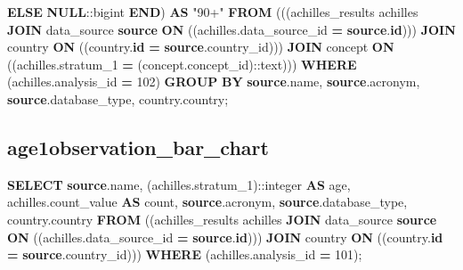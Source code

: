 \documentclass[
]{book}
\newenvironment{Shaded}{\begin{snugshade}}{\end{snugshade}}
\newcommand{\CharTok}[1]{\textcolor[rgb]{0.31,0.60,0.02}{#1}}
\newcommand{\ControlFlowTok}[1]{\textcolor[rgb]{0.13,0.29,0.53}{\textbf{#1}}}
\newcommand{\DecValTok}[1]{\textcolor[rgb]{0.00,0.00,0.81}{#1}}
\newcommand{\FunctionTok}[1]{\textcolor[rgb]{0.00,0.00,0.00}{#1}}
\newcommand{\KeywordTok}[1]{\textcolor[rgb]{0.13,0.29,0.53}{\textbf{#1}}}
\newcommand{\NormalTok}[1]{#1}
\newcommand{\OperatorTok}[1]{\textcolor[rgb]{0.81,0.36,0.00}{\textbf{#1}}}
\newcommand{\OtherTok}[1]{\textcolor[rgb]{0.56,0.35,0.01}{#1}}
\begin{document}
\begin{Shaded}
\begin{Highlighting}[]
           \ControlFlowTok{ELSE} \KeywordTok{NULL}\NormalTok{:}\CharTok{:bigint}
       \ControlFlowTok{END}\NormalTok{) }\KeywordTok{AS} \OtherTok{"90+"}
  \KeywordTok{FROM}\NormalTok{ (((achilles\_results achilles}
    \KeywordTok{JOIN}\NormalTok{ data\_source }\KeywordTok{source} \KeywordTok{ON}\NormalTok{ ((achilles.data\_source\_id }\OperatorTok{=} \KeywordTok{source}\NormalTok{.}\KeywordTok{id}\NormalTok{)))}
    \KeywordTok{JOIN}\NormalTok{ country }\KeywordTok{ON}\NormalTok{ ((country.}\KeywordTok{id} \OperatorTok{=} \KeywordTok{source}\NormalTok{.country\_id)))}
    \KeywordTok{JOIN}\NormalTok{ concept }\KeywordTok{ON}\NormalTok{ ((achilles.stratum\_1 }\OperatorTok{=}\NormalTok{ (concept.concept\_id):}\CharTok{:text}\NormalTok{)))}
 \KeywordTok{WHERE}\NormalTok{ (achilles.analysis\_id }\OperatorTok{=} \DecValTok{102}\NormalTok{)}
 \KeywordTok{GROUP} \KeywordTok{BY} \KeywordTok{source}\NormalTok{.name, }\KeywordTok{source}\NormalTok{.acronym, }\KeywordTok{source}\NormalTok{.database\_type, country.country;}
\end{Highlighting}
\end{Shaded}

\hypertarget{age1observation_bar_chart}{%
\subsection*{age1observation\_bar\_chart}\label{age1observation_bar_chart}}

\begin{Shaded}
\begin{Highlighting}[]
\KeywordTok{SELECT} \KeywordTok{source}\NormalTok{.name,}
\NormalTok{   (achilles.stratum\_1):}\CharTok{:integer} \KeywordTok{AS}\NormalTok{ age,}
\NormalTok{   achilles.count\_value }\KeywordTok{AS} \FunctionTok{count}\NormalTok{,}
   \KeywordTok{source}\NormalTok{.acronym,}
   \KeywordTok{source}\NormalTok{.database\_type,}
\NormalTok{   country.country}
  \KeywordTok{FROM}\NormalTok{ ((achilles\_results achilles}
    \KeywordTok{JOIN}\NormalTok{ data\_source }\KeywordTok{source} \KeywordTok{ON}\NormalTok{ ((achilles.data\_source\_id }\OperatorTok{=} \KeywordTok{source}\NormalTok{.}\KeywordTok{id}\NormalTok{)))}
    \KeywordTok{JOIN}\NormalTok{ country }\KeywordTok{ON}\NormalTok{ ((country.}\KeywordTok{id} \OperatorTok{=} \KeywordTok{source}\NormalTok{.country\_id)))}
 \KeywordTok{WHERE}\NormalTok{ (achilles.analysis\_id }\OperatorTok{=} \DecValTok{101}\NormalTok{);}
\end{Highlighting}
\end{Shaded}
\end{document}
